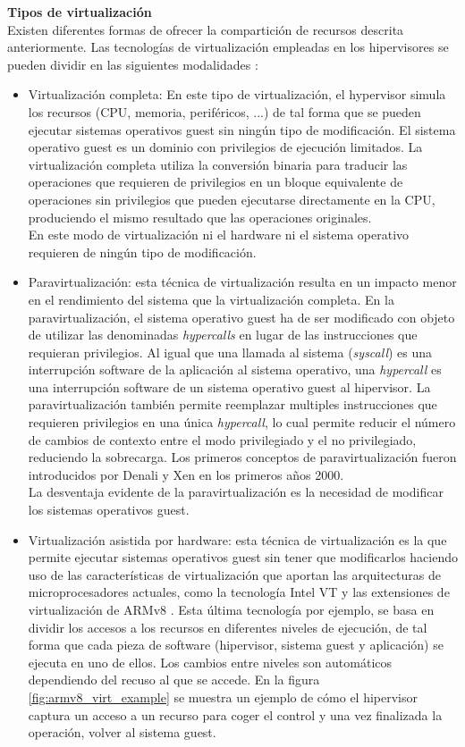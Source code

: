 \textbf{Tipos de virtualización}\\
Existen diferentes formas de ofrecer la compartición de recursos descrita anteriormente. Las tecnologías de virtualización empleadas en los hipervisores se pueden dividir en las siguientes modalidades \cite{hyper_perf_arm}:
\begin{itemize}
	\item Virtualización completa: En este tipo de virtualización, el hypervisor simula los recursos (CPU, memoria, periféricos, ...) de tal forma que se pueden ejecutar sistemas operativos guest sin ningún tipo de modificación. El sistema operativo guest es un dominio con privilegios de ejecución limitados. La virtualización completa utiliza la conversión binaria para traducir las operaciones que requieren de privilegios en un bloque equivalente de operaciones sin privilegios que pueden ejecutarse directamente en la CPU, produciendo el mismo resultado que las operaciones originales.\\
	En este modo de virtualización ni el hardware ni el sistema operativo requieren de ningún tipo de modificación.
	\item Paravirtualización: esta técnica de virtualización resulta en un impacto menor en el rendimiento del sistema que la virtualización completa. En la paravirtualización, el sistema operativo guest ha de ser modificado con objeto de utilizar las denominadas \textit{hypercalls} en lugar de las instrucciones que requieran privilegios. Al igual que una llamada al sistema (\textit{syscall}) es una interrupción software de la aplicación al sistema operativo, una \textit{hypercall} es una interrupción software de un sistema operativo guest al hipervisor. La paravirtualización también permite reemplazar multiples instrucciones que requieren privilegios en una única \textit{hypercall}, lo cual permite reducir el número de cambios de contexto entre el modo privilegiado y el no privilegiado, reduciendo la sobrecarga. Los primeros conceptos de paravirtualización fueron introducidos por Denali \cite{denali} y Xen en los primeros años 2000.\\
	La desventaja evidente de la paravirtualización es la necesidad de modificar los sistemas operativos guest.
	\item Virtualización asistida por hardware: esta técnica de virtualización es la que permite ejecutar sistemas operativos guest sin tener que modificarlos haciendo uso de las características de virtualización que aportan las arquitecturas de microprocesadores actuales, como la tecnología Intel VT \cite{intel_vt} y las extensiones de virtualización de ARMv8 \cite{armv8_virt}. Esta última tecnología por ejemplo, se basa en dividir los accesos a los recursos en diferentes niveles de ejecución, de tal forma que cada pieza de software (hipervisor, sistema guest y aplicación) se ejecuta en uno de ellos. Los cambios entre niveles son automáticos dependiendo del recuso al que se accede. En la figura \ref{fig:armv8_virt_example} se muestra un ejemplo de cómo el hipervisor captura un acceso a un recurso para coger el control y una vez finalizada la operación, volver al sistema guest.\\


\end{itemize}
